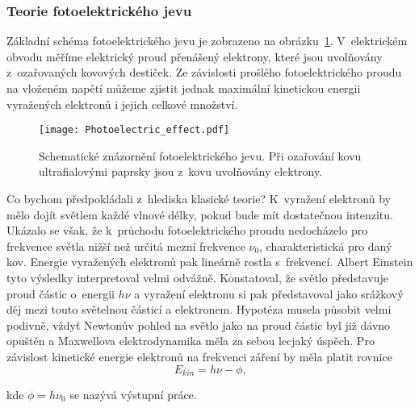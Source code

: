 \subsubsection{Teorie fotoelektrického jevu}
Základní schéma fotoelektrického jevu je zobrazeno na obrázku~\ref{obr:Fotoefekt}. V~elektrickém obvodu měříme elektrický proud přenášený elektrony, které jsou uvolňovány z~ozařovaných kovových destiček. Ze závislosti prošlého fotoelektrického proudu na vloženém napětí můžeme zjistit jednak maximální kinetickou energii vyražených elektronů i jejich celkové množství.

\begin{figure} [ht]
\centering
\texttt{[image: Photoelectric\_effect.pdf]}
\caption[Fotoelektrický jev]{Schematické znázornění fotoelektrického jevu. Při ozařování kovu ultrafialovými paprsky jsou z~kovu uvolňovány elektrony.}
\label{obr:Fotoefekt}
\end{figure}

Co bychom předpokládali z~hlediska klasické teorie? K~vyražení elektronů by mělo dojít světlem každé vlnové délky, pokud bude mít dostatečnou intenzitu. Ukázalo se však, že k~průchodu fotoelektrického proudu nedocházelo pro frekvence světla nižší než určitá mezní frekvence $\nu_0$, charakteristická pro daný kov. Energie vyražených elektronů pak lineárně rostla s~frekvencí.
Albert Einstein tyto výsledky interpretoval velmi odvážně. Konstatoval, že světlo představuje proud částic o~energii $h\nu$ a vyražení elektronu si pak představoval jako srážkový děj mezi touto světelnou částicí a elektronem. Hypotéza musela působit velmi podivně, vždyť Newtonův pohled na světlo jako na proud částic byl již dávno opuštěn a Maxwellova elektrodynamika měla za sebou lecjaký úspěch. Pro závislost kinetické energie elektronů na frekvenci záření by měla platit rovnice
\begin{equation}
E_{kin} = h\nu - \phi\mbox{,}
\label{rov:Fotojev1}
\end{equation}

\noindent kde $\phi = h\nu_0$ se nazývá výstupní práce. 

